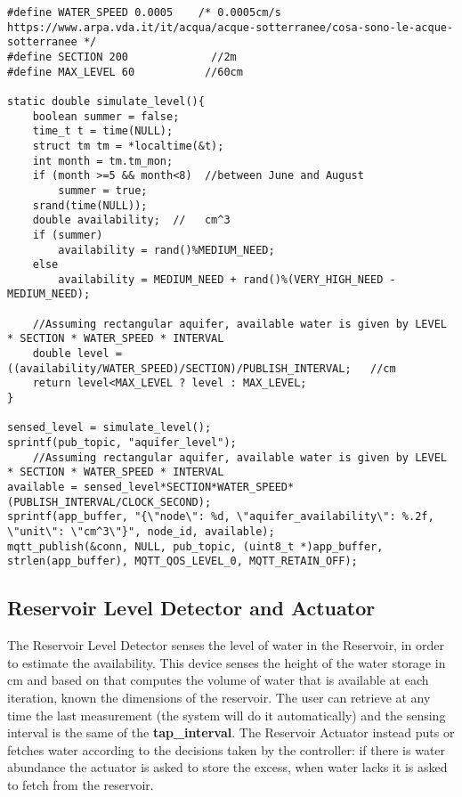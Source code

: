 \begin{lstlisting}
#define WATER_SPEED 0.0005    /* 0.0005cm/s   https://www.arpa.vda.it/it/acqua/acque-sotterranee/cosa-sono-le-acque-sotterranee */
#define SECTION 200             //2m
#define MAX_LEVEL 60           //60cm

static double simulate_level(){
    boolean summer = false;
    time_t t = time(NULL);
    struct tm tm = *localtime(&t);
    int month = tm.tm_mon;
    if (month >=5 && month<8)  //between June and August
        summer = true;
    srand(time(NULL));
    double availability;  //   cm^3
    if (summer)
        availability = rand()%MEDIUM_NEED;
    else
        availability = MEDIUM_NEED + rand()%(VERY_HIGH_NEED - MEDIUM_NEED);

    //Assuming rectangular aquifer, available water is given by LEVEL * SECTION * WATER_SPEED * INTERVAL
    double level = ((availability/WATER_SPEED)/SECTION)/PUBLISH_INTERVAL;   //cm
    return level<MAX_LEVEL ? level : MAX_LEVEL;
}    
    
sensed_level = simulate_level();
sprintf(pub_topic, "aquifer_level");
	//Assuming rectangular aquifer, available water is given by LEVEL * SECTION * WATER_SPEED * INTERVAL
available = sensed_level*SECTION*WATER_SPEED*(PUBLISH_INTERVAL/CLOCK_SECOND);
sprintf(app_buffer, "{\"node\": %d, \"aquifer_availability\": %.2f, \"unit\": \"cm^3\"}", node_id, available);
mqtt_publish(&conn, NULL, pub_topic, (uint8_t *)app_buffer, strlen(app_buffer), MQTT_QOS_LEVEL_0, MQTT_RETAIN_OFF);
\end{lstlisting}



\subsection{Reservoir Level Detector and Actuator}
The Reservoir Level Detector senses the level of water in the Reservoir, in order to estimate the availability. This device senses the height of the water storage in cm and based on that computes the volume of water that is available at each iteration, known the dimensions of the reservoir. The user can retrieve at any time the last measurement (the system will do it automatically) and the sensing interval is the same of the \textbf{tap\_interval}. The Reservoir Actuator instead puts or fetches water according to the decisions taken by the controller: if there is water abundance the actuator is asked to store the excess, when water lacks it is asked to fetch from the reservoir.

